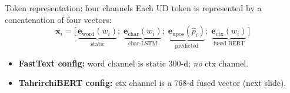 \documentclass{beamer}
\begin{document}
\begin{frame}{Token representation: four channels}
Each UD token is represented by a concatenation of four vectors:
\begin{equation*}
  \mathbf{x}_i = \big[\,
    \underbrace{\mathbf{e}_{\text{word}}(w_i)}_{\text{static}};\;
    \underbrace{\mathbf{e}_{\text{char}}(w_i)}_{\text{char-LSTM}};\;
    \underbrace{\mathbf{e}_{\text{upos}}(\hat p_i)}_{\text{predicted}};\;
    \underbrace{\mathbf{e}_{\text{ctx}}(w_i)}_{\text{fused BERT}}
  \,\big]
\end{equation*}
\centering
{}

\vspace{0.25cm}
\footnotesize
\begin{itemize}\setlength\itemsep{2pt}
  \item \textbf{FastText config:} word channel is static 300-d; \emph{no}
        ctx channel.
  \item \textbf{TahrirchiBERT config:} ctx channel is a 768-d fused
        vector (next slide).
\end{itemize}
\end{frame}
\end{document}
